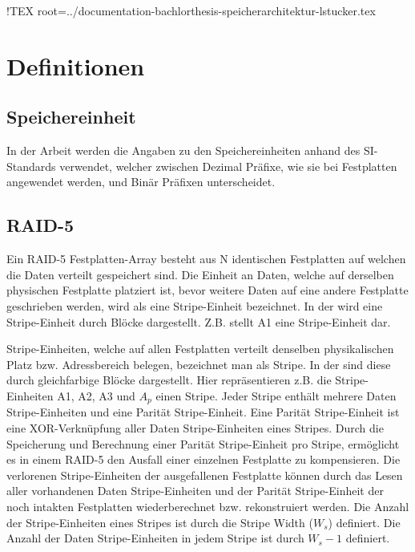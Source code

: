 !TEX root=../documentation-bachlorthesis-speicherarchitektur-lstucker.tex

\cleardoublepage
\chapter{Definitionen}

\section{Speichereinheit}
In der Arbeit werden die Angaben zu den Speichereinheiten anhand des SI-Standards \cite{Technology1998} verwendet, welcher zwischen Dezimal Präfixe, wie sie bei Festplatten angewendet werden, und Binär Präfixen unterscheidet.

\section{RAID-5}\label{RAID-5}

Ein RAID-5 Festplatten-Array besteht aus N identischen Festplatten auf welchen die Daten verteilt gespeichert sind. Die Einheit an Daten, welche auf derselben physischen Festplatte platziert ist, bevor weitere Daten auf eine andere Festplatte geschrieben werden, wird als eine Stripe-Einheit bezeichnet.
In der  wird eine Stripe-Einheit durch Blöcke dargestellt. Z.B. stellt A1 eine Stripe-Einheit dar. \cite{Kuratti1995}

Stripe-Einheiten, welche auf allen Festplatten verteilt denselben physikalischen Platz bzw. Adressbereich belegen, bezeichnet man als Stripe. In der  sind diese durch gleichfarbige Blöcke dargestellt. Hier repräsentieren z.B. die Stripe-Einheiten A1, A2, A3 und $A_{p}$ einen Stripe.
Jeder Stripe enthält mehrere Daten Stripe-Einheiten und eine Parität Stripe-Einheit. Eine Parität Stripe-Einheit ist eine XOR-Verknüpfung aller Daten Stripe-Einheiten eines Stripes. Durch die Speicherung und Berechnung einer Parität Stripe-Einheit pro Stripe, ermöglicht es in einem RAID-5 den Ausfall einer einzelnen Festplatte zu kompensieren. Die verlorenen Stripe-Einheiten der ausgefallenen Festplatte können durch das Lesen aller vorhandenen Daten Stripe-Einheiten und der Parität Stripe-Einheit der noch intakten Festplatten wiederberechnet bzw. rekonstruiert werden. Die Anzahl der Stripe-Einheiten eines Stripes ist durch die Stripe Width  ($W_{s}$) definiert. Die Anzahl der Daten Stripe-Einheiten in jedem Stripe ist durch $W_{s} -1$ definiert. \cite{Kuratti1995}


